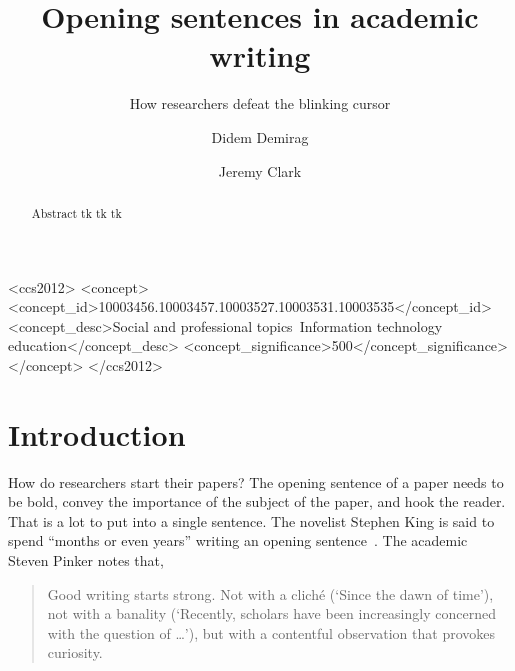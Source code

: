 \documentclass[sigconf,anonymous]{acmart}
\begin{document}
	
\title{Opening sentences in academic writing}
\subtitle{How researchers defeat the blinking cursor}

\author{Didem Demirag}
\author{Jeremy Clark}
	
\begin{abstract}
Abstract tk tk tk
\end{abstract}
	
\begin{CCSXML}
<ccs2012>
   <concept>
       <concept_id>10003456.10003457.10003527.10003531.10003535</concept_id>
       <concept_desc>Social and professional topics~Information technology education</concept_desc>
       <concept_significance>500</concept_significance>
       </concept>
 </ccs2012>
\end{CCSXML}

	
	
\maketitle
	
	
\section{Introduction}
 
How do researchers start their papers? The opening sentence of a paper needs to be bold, convey the importance of the subject of the paper, and hook the reader. That is a lot to put into a single sentence. The novelist Stephen King is said to spend ``months or even years'' writing an opening sentence~\cite{Fas13}. The academic Steven Pinker notes that,

\begin{quote}
Good writing starts strong. Not with a cliché (`Since the dawn of time’), not with a banality (`Recently, scholars have been increasingly concerned with the question of …’), but with a contentful observation that provokes curiosity.~\cite{Pin15}
\end{quote}
\end{document}
